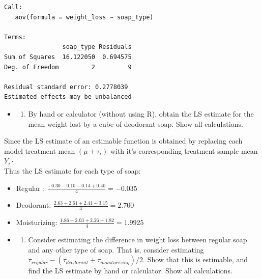 \documentclass[11pt]{article}
\providecommand{\tightlist}{%
      \setlength{\itemsep}{0pt}\setlength{\parskip}{0pt}}
\begin{document}
    
    \begin{verbatim}
Call:
   aov(formula = weight_loss ~ soap_type)

Terms:
                soap_type Residuals
Sum of Squares  16.122050  0.694575
Deg. of Freedom         2         9

Residual standard error: 0.2778039
Estimated effects may be unbalanced
    \end{verbatim}

    
    \begin{itemize}
\item
  \begin{enumerate}
  \def\labelenumi{(\alph{enumi})}
  \setcounter{enumi}{1}
  \tightlist
  \item
    By hand or calculator (without using R), obtain the LS estimate for
    the mean weight lost by a cube of deodorant soap. Show all
    calculations.
  \end{enumerate}
\end{itemize}

    Since the LS estimate of an estimable function is obtained by replacing
each model treatment mean \((\mu + \tau_i)\) with it's corresponding
treatment sample mean \(Y_i \cdot\) \\

Thus the LS estimate for each type of soap:

\begin{itemize}
\item
  Regular : \(\frac{-0.30-0.10-0.14+0.40}{4} = -0.035\)
\item
  Deodorant: \(\frac{2.63+2.61+2.41+3.15}{4}= 2.700\)
\item
  Moisturizing: \(\frac{1.86+2.03+2.26+1.82}{4} = 1.9925\)
\end{itemize}

    \begin{itemize}
\item
  \begin{enumerate}
  \def\labelenumi{(\alph{enumi})}
  \setcounter{enumi}{2}
  \tightlist
  \item
    Consider estimating the difference in weight loss between regular
    soap and any other type of soap. That is, consider estimating
    \(\tau_{ regular} - (\tau_{deodorant} + \tau_{ moisturizing})/2\).
    Show that this is estimable, and find the LS estimate by hand or
    calculator. Show all calculations.
  \end{enumerate}
\end{itemize}
\end{document}
